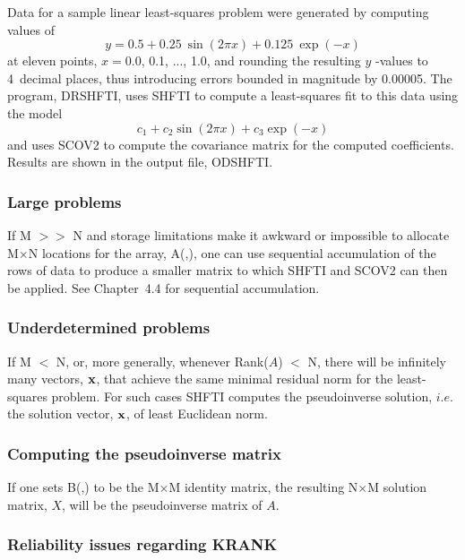 \documentclass[twoside]{MATH77}
\begin{document}
Data for a sample linear least-squares problem were generated by computing
values of%
\begin{equation*}
y=0.5+0.25\ \sin (2\pi x)+0.125\ \exp (-x)
\end{equation*}
at eleven points, $x=0.0$, 0.1, ..., 1.0, and rounding the resulting $y$%
-values to 4~decimal places, thus introducing errors bounded in magnitude by
0.00005. The program, DRSHFTI, uses SHFTI to compute a least-squares fit to
this data using the model%
\begin{equation*}
c_1+c_2\sin (2\pi x)+c_3\exp (-x)
\end{equation*}
and uses SCOV2 to compute the covariance matrix for the computed
coefficients. Results are shown in the output file, ODSHFTI.

\subsubsection{Large problems}

If M $>>$ N and storage limitations make it awkward or impossible to
allocate M$\times $N locations for the array, A(,), one can use sequential
accumulation of the rows of data to produce a smaller matrix to which SHFTI
and SCOV2 can then be applied. See Chapter~4.4 for sequential accumulation.

\subsubsection{Underdetermined problems}

If M $<$ N, or, more generally, whenever Rank($A$) $<$ N, there will be
infinitely many vectors, ${\bf x}$, that achieve the same minimal residual
norm for the least-squares problem. For such cases SHFTI computes the
pseudoinverse solution, $i.e$. the solution vector, ${\bf x}$, of least
Euclidean norm.

\subsubsection{Computing the pseudoinverse matrix}

If one sets B(,) to be the M$\times$M identity matrix, the resulting
N$\times $M solution matrix, $X$, will be the pseudoinverse matrix of $A$.

\subsubsection{Reliability issues regarding KRANK}
\end{document}
